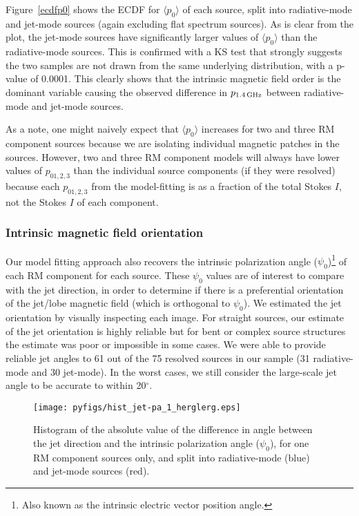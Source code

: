 \documentclass{mnras}
\begin{document}
Figure~\ref{ecdfp0} shows the ECDF for $\langle p_0 \rangle$ of each source, split into radiative-mode and jet-mode sources (again excluding flat spectrum sources). As is clear from the plot, the jet-mode sources have significantly larger values of $\langle p_0 \rangle$ than the radiative-mode sources. This is confirmed with a KS test that strongly suggests the two samples are not drawn from the same underlying distribution, with a p-value of 0.0001. This clearly shows that the intrinsic magnetic field order is the dominant variable causing the observed difference in $p_{1.4\, {\rm GHz}}$ between radiative-mode and jet-mode sources. 

As a note, one might naively expect that $\langle p_0 \rangle$ increases for two and three RM component sources because we are isolating individual magnetic patches in the sources. However, two and three RM component models will always have lower values of $p_{01,2,3}$ than the individual source components (if they were resolved) because each $p_{01,2,3}$ from the model-fitting is as a fraction of the total Stokes $I$, not the Stokes $I$ of each component. 

\subsubsection{Intrinsic magnetic field orientation} \label{bfieldgeometry}
Our model fitting approach also recovers the intrinsic polarization angle ($\psi_0$)\footnote{Also known as the intrinsic electric vector position angle.} of each RM component for each source. These $\psi_0$ values are of interest to compare with the jet direction, in order to determine if there is a preferential orientation of the jet/lobe magnetic field (which is orthogonal to $\psi_0$). 
We estimated the jet orientation by visually inspecting each image. For straight sources, our estimate of the jet orientation is highly reliable but for bent or complex source structures the estimate was poor or impossible in some cases. We were able to provide reliable jet angles to 61 out of the 75 resolved sources in our sample (31 radiative-mode and 30 jet-mode). In the worst cases, we still consider the large-scale jet angle to be accurate to within 20$^\circ$. 

\begin{figure} 
\centering
    \texttt{[image: pyfigs/hist\_jet-pa\_1\_herglerg.eps]} 
    \caption{ {\small Histogram of the absolute value of the difference in angle between the jet direction and the intrinsic polarization angle ($\psi_0$), 
    for one RM component sources only, and split into radiative-mode (blue) and jet-mode sources (red). } }
    \label{histjetpa1}
\end{figure} 
\end{document}
